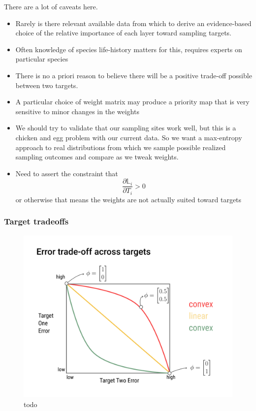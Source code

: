 \documentclass[11pt]{article}
\makeatletter
\def\maxwidth{\ifdim\Gin@nat@width>\linewidth\linewidth
\else\Gin@nat@width\fi}
\let\Oldincludegraphics\includegraphics
\renewcommand{\includegraphics}[1]{\Oldincludegraphics[width=\maxwidth]{#1}}
\makeatother
\begin{document}
There are a lot of caveats here.

\begin{itemize}
\tightlist
\item
  Rarely is there relevant available data from which to derive an
  evidence-based choice of the relative importance of each layer toward
  sampling targets.
\item
  Often knowledge of species life-history matters for this, requires
  experts on particular species
\item
  There is no a priori reason to believe there will be a positive
  trade-off possible between two targets.
\item
  A particular choice of weight matrix may produce a priority map that
  is very sensitive to minor changes in the weights
\item
  We should try to validate that our sampling sites work well, but this
  is a chicken and egg problem with our current data. So we want a
  max-entropy approach to real distributions from which we sample
  possible realized sampling outcomes and compare as we tweak weights.
\item
  Need to assert the constraint that
  \[\frac{\partial \mathbb{L}_i}{\partial
  T_i}>0\] or otherwise that means the weights are not actually suited
  toward targets
\end{itemize}

\hypertarget{target-tradeoffs}{%
\subsubsection{Target tradeoffs}\label{target-tradeoffs}}

\begin{figure}
\hypertarget{fig:tradeoff}{%
\centering
\includegraphics{./figures/tradeoff_concept.png}
\caption{todo}\label{fig:tradeoff}
}
\end{figure}
\end{document}
